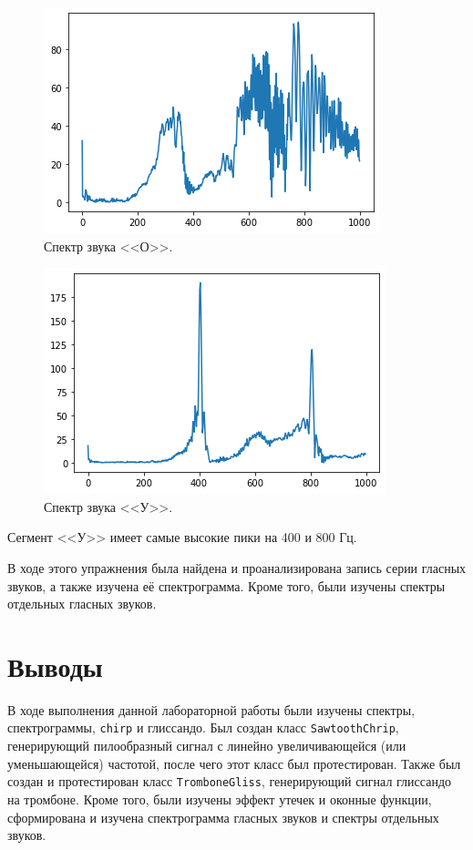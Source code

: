 \documentclass[a4paper, 14pt]{extarticle}
\begin{document}
    \begin{figure}[H]
        \centering
        \includegraphics[width=0.7\linewidth]{resources/Images/task6_spectrum_o}
        \caption{Спектр звука <<О>>.}
        \label{fig:task6_spectrum_o}
    \end{figure}

    \begin{figure}[H]
        \centering
        \includegraphics[width=0.7\linewidth]{resources/Images/task6_spectrum_u}
        \caption{Спектр звука <<У>>.}
        \label{fig:task6_spectrum_u}
    \end{figure}

    Сегмент <<У>> имеет самые высокие пики на 400 и 800 Гц.

    В ходе этого упражнения была найдена и проанализирована запись серии гласных звуков, а также изучена её спектрограмма.
    Кроме того, были изучены спектры отдельных гласных звуков.

    \newpage

    \section{Выводы}
    \label{sec:conclusions}

    В ходе выполнения данной лабораторной работы были изучены спектры, спектрограммы, \texttt{chirp} и глиссандо.
    Был создан класс \texttt{SawtoothChrip}, генерирующий пилообразный сигнал с линейно увеличивающейся
    (или уменьшающейся) частотой, после чего этот класс был протестирован. Также был создан и протестирован класс
    \texttt{TromboneGliss}, генерирующий сигнал глиссандо на тромбоне. Кроме того, были изучены эффект утечек и
    оконные функции, сформирована и изучена спектрограмма гласных звуков и спектры отдельных звуков.
\end{document}
